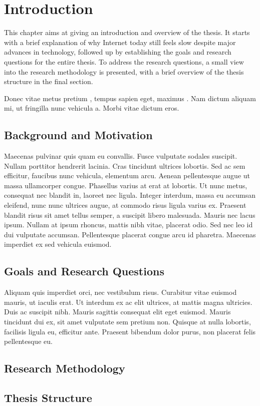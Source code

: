 \chapter{Introduction}

This chapter aims at giving an introduction and overview of the thesis. It starts with a brief explanation of why Internet today still feels slow despite major advances in technology, followed up by establishing the goals and research questions for the entire thesis. To address the research questions, a small view into the research methodology is presented, with a brief overview of the thesis structure in the final section.

Donec vitae metus pretium \cite{latexcompanion}, tempus sapien eget, maximus \cite{knuthwebsite}. Nam dictum aliquam mi, ut fringilla nunc vehicula a. Morbi vitae dictum eros.

\section{Background and Motivation}

Maecenas pulvinar quis quam eu convallis. Fusce vulputate sodales suscipit. Nullam porttitor hendrerit lacinia. Cras tincidunt ultrices lobortis. Sed ac sem efficitur, faucibus nunc vehicula, elementum arcu. Aenean pellentesque augue ut massa ullamcorper congue. Phasellus varius at erat at lobortis. Ut nunc metus, consequat nec blandit in, laoreet nec ligula. Integer interdum, massa eu accumsan eleifend, nunc nunc ultrices augue, at commodo risus ligula varius ex. Praesent blandit risus sit amet tellus semper, a suscipit libero malesuada. Mauris nec lacus ipsum. Nullam at ipsum rhoncus, mattis nibh vitae, placerat odio. Sed nec leo id dui vulputate accumsan. Pellentesque placerat congue arcu id pharetra. Maecenas imperdiet ex sed vehicula euismod.

\section{Goals and Research Questions}

Aliquam quis imperdiet orci, nec vestibulum risus. Curabitur vitae euismod mauris, ut iaculis erat. Ut interdum ex ac elit ultrices, at mattis magna ultricies. Duis ac suscipit nibh. Mauris sagittis consequat elit eget euismod. Mauris tincidunt dui ex, sit amet vulputate sem pretium non. Quisque at nulla lobortis, facilisis ligula eu, efficitur ante. Praesent bibendum dolor purus, non placerat felis pellentesque eu.

\section{Research Methodology}

\section{Thesis Structure}